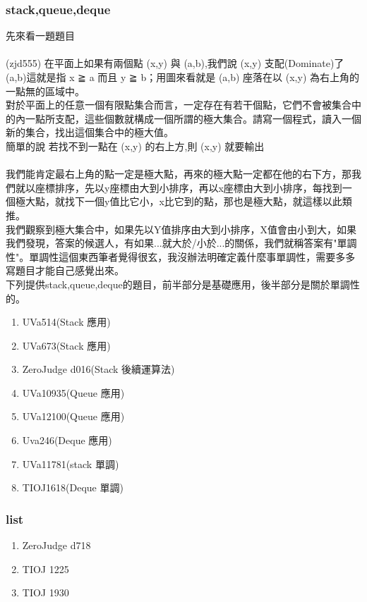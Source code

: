 \subsubsection{stack,queue,deque}
先來看一題題目\\ \\
(zjd555)
在平面上如果有兩個點 (x,y) 與 (a,b),我們說 (x,y) 支配(Dominate)了(a,b)這就是指 x ≧ a
而且 y ≧ b；用圖來看就是 (a,b) 座落在以 (x,y) 為右上角的一點無的區域中。\\ 
對於平面上的任意一個有限點集合而言，一定存在有若干個點，它們不會被集合中的內一點所支配，這些個數就構成一個所謂的極大集合。請寫一個程式，讀入一個新的集合，找出這個集合中的極大值。\\
簡單的說  若找不到一點在 (x,y) 的右上方,則 (x,y) 就要輸出\\ \\
我們能肯定最右上角的點一定是極大點，再來的極大點一定都在他的右下方，那我們就以座標排序，先以y座標由大到小排序，再以x座標由大到小排序，每找到一個極大點，就找下一個y值比它小，x比它到的點，那也是極大點，就這樣以此類推。\\
我們觀察到極大集合中，如果先以Y值排序由大到小排序，X值會由小到大，如果我們發現，答案的候選人，有如果...就大於/小於...的關係，我們就稱答案有"單調性"。單調性這個東西筆者覺得很玄，我沒辦法明確定義什麼事單調性，需要多多寫題目才能自己感覺出來。\\
下列提供stack,queue,deque的題目，前半部分是基礎應用，後半部分是關於單調性的。
\begin{enumerate}
\item UVa514(Stack 應用)
\item UVa673(Stack 應用)
\item ZeroJudge d016(Stack 後續運算法)
\item UVa10935(Queue 應用)
\item UVa12100(Queue 應用)
\item Uva246(Deque 應用)
\item UVa11781(stack 單調)
\item TIOJ1618(Deque 單調)
\end{enumerate}
\subsubsection{list}
\begin{enumerate}
\item ZeroJudge d718
\item TIOJ 1225
\item TIOJ 1930
\end{enumerate}
